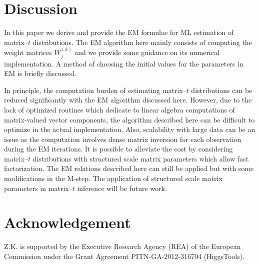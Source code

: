 \documentclass[english,listof=totoc]{scrartcl}
\begin{document}
\section{Discussion}\label{sec:discussion}

In this paper we derive and provide the EM formulae for ML estimation
of matrix--$t$ distributions. The EM algorithm here mainly consists of
computing the weight matrices $W_j^{(k)}$ and we provide some guidance
on its numerical implementation. A method of choosing the initial
values for the parameters in EM is briefly discussed.

In principle, the computation burden of estimating matrix--$t$
distributions can be reduced significantly with the EM algorithm
discussed here. However, due to the lack of optimized routines which
dedicate to linear algebra computations of matrix-valued vector
components, the algorithm described here can be difficult to optimize
in the actual implementation. Also, scalability with large data can be
an issue as the computation involves dense matrix inversion for each
observation during the EM iterations. It is possible to alleviate the
cost by considering matrix--$t$ distributions with structured scale
matrix parameters which allow fast factorization. The EM relations
described here can still be applied but with some modifications in the
M-step. The application of structured scale matrix parameters in
matrix--$t$ inference will be future work.

\section*{Acknowledgement}
Z.K. is supported by  the  Executive  Research  Agency  (REA)  of  the
European Commission under the Grant Agreement PITN-GA-2012-316704
(HiggsTools).



\end{document}
